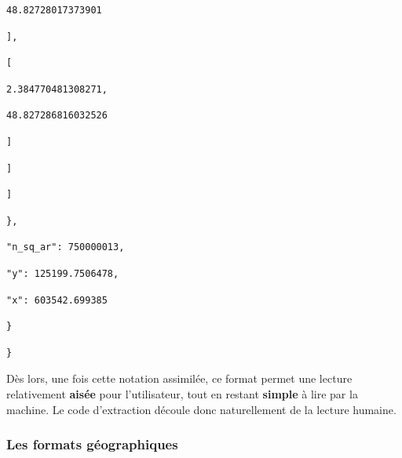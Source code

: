 \documentclass[
  11pt,
  french,
]{article}
\begin{document}
\begin{tcolorbox}[title= Chargement du jeu de données sous un format hiérarchisé dans Python ,colback=boitecode]
\begin{lstlisting}[style=code]
                            48.82728017373901\end{lstlisting}
\begin{lstlisting}[style=code]
                        ],\end{lstlisting}
\begin{lstlisting}[style=code]
                        [\end{lstlisting}
\begin{lstlisting}[style=code]
                            2.384770481308271,\end{lstlisting}
\begin{lstlisting}[style=code]
                            48.827286816032526\end{lstlisting}
\begin{lstlisting}[style=code]
                        ]\end{lstlisting}
\begin{lstlisting}[style=code]
                    ]\end{lstlisting}
\begin{lstlisting}[style=code]
                ]\end{lstlisting}
\begin{lstlisting}[style=code]
            },\end{lstlisting}
\begin{lstlisting}[style=code]
            "n_sq_ar": 750000013,\end{lstlisting}
\begin{lstlisting}[style=code]
            "y": 125199.7506478,\end{lstlisting}
\begin{lstlisting}[style=code]
            "x": 603542.699385\end{lstlisting}
\begin{lstlisting}[style=code]
      }\end{lstlisting}
\begin{lstlisting}[style=code]
  }\end{lstlisting}
\end{tcolorbox}

\hfill\break
\hfill\break
Dès lors, une fois cette notation assimilée, ce format permet une
lecture relativement \textbf{aisée} pour l'utilisateur, tout en restant
\textbf{simple} à lire par la machine. Le code d'extraction découle donc
naturellement de la lecture humaine.

\hypertarget{les-formats-guxe9ographiques}{%
\subsubsection{Les formats
géographiques}\label{les-formats-guxe9ographiques}}
\end{document}
